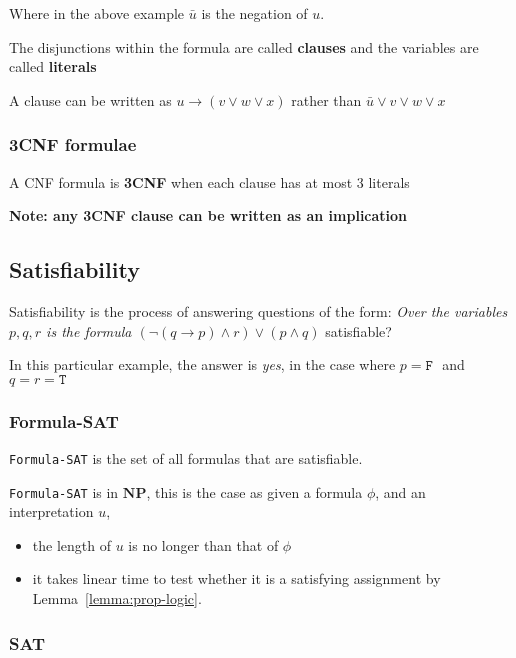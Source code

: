 \documentclass{article}
\newcommand{\T}{\texttt{T }}
\newcommand{\F}{\texttt{F }}
\newcommand{\NP}{\mathbf{NP}}
\begin{document}
Where in the above example $\bar{u}$ is the negation of $u$.

The disjunctions within the formula are called \textbf{clauses } and the variables are called \textbf{literals}

A clause can be written as $u \rightarrow (v \vee w \vee x)$ rather than $\bar{u} \vee v \vee w \vee x$

\subsubsection{3CNF formulae}
\label{subsubsec:3cnf}

A CNF formula is \textbf{3CNF} when each clause has at most 3 literals

\textbf{Note: any 3CNF clause can be written as an implication}

\subsection{Satisfiability}
\label{subsec:satisfiability}


Satisfiability is the process of answering questions of the form: \textit{Over the variables $p,q,r$ is the formula $(\neg(q \rightarrow p) \wedge r) \vee (p \wedge q)$}  satisfiable?

In this particular example, the answer is \textit{yes}, in the case where $p= \F$ and $q = r = \T$

\subsubsection{Formula-SAT}
\label{subsubsec:fsat}

\texttt{Formula-SAT} is the set of all formulas that are satisfiable.

\texttt{Formula-SAT} is in $\NP$, this is the case as given a formula $\phi$, and an interpretation $u$,
\begin{itemize}
  \item the length of $u$ is no longer than that of $\phi$
  \item it takes linear time to test whether it is a satisfying assignment by Lemma~\ref{lemma:prop-logic}.
\end{itemize}

\subsubsection{SAT}
\label{subsubsec:sat}
\end{document}
